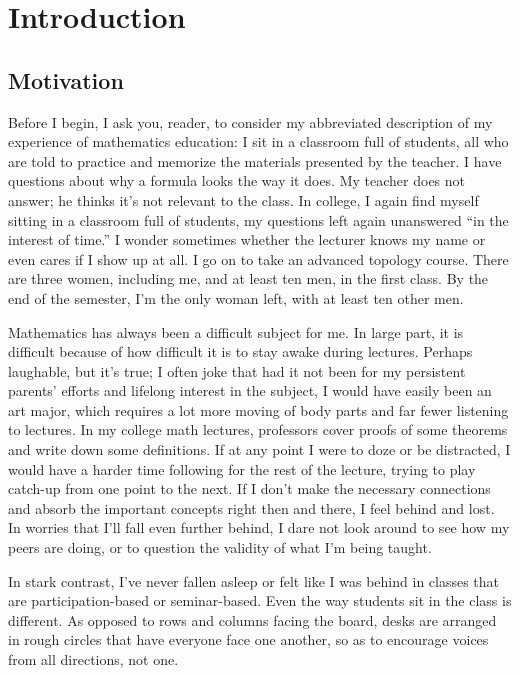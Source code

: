 \chapter{Introduction}
\section{Motivation}

Before I begin, I ask you, reader, to consider my abbreviated description of my experience of mathematics education: I sit in a classroom full of students, all who are told to practice and memorize the materials presented by the teacher. I have questions about why a formula looks the way it does. My teacher does not answer; he thinks it's not relevant to the class. In college, I again find myself sitting in a classroom full of students, my questions left again unanswered ``in the interest of time.'' I wonder sometimes whether the lecturer knows my name or even cares if I show up at all. I go on to take an advanced topology course. There are three women, including me, and at least ten men, in the first class. By the end of the semester, I'm the only woman left, with at least ten other men.

Mathematics has always been a difficult subject for me. In large part, it is difficult because of how difficult it is to stay awake during lectures. Perhaps laughable, but it's true; I often joke that had it not been for my persistent parents' efforts and lifelong interest in the subject, I would have easily been an art major, which requires a lot more moving of body parts and far fewer listening to lectures. In my college math lectures, professors cover proofs of some theorems and write down some definitions. If at any point I were to doze or be distracted, I would have a harder time following for the rest of the lecture, trying to play catch-up from one point to the next. If I don't make the necessary connections and absorb the important concepts right then and there, I feel behind and lost. In worries that I'll fall even further behind, I dare not look around to see how my peers are doing, or to question the validity of what I'm being taught.

In stark contrast, I've never fallen asleep or felt like I was behind in classes that are participation-based or seminar-based. Even the way students sit in the class is different. As opposed to rows and columns facing the board, desks are arranged in rough circles that have everyone face one another, so as to encourage voices from all directions, not one.

